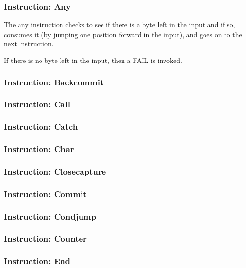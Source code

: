 \subsubsection{Instruction: Any}

The any instruction checks to see if there is a byte left in the input
and if so, consumes it (by jumping one position forward in the input),
and goes on to the next instruction.

If there is no byte left in the input, then a FAIL is invoked.

\subsubsection{Instruction: Backcommit}

\subsubsection{Instruction: Call}

\subsubsection{Instruction: Catch}

\subsubsection{Instruction: Char}

\subsubsection{Instruction: Closecapture}

\subsubsection{Instruction: Commit}

\subsubsection{Instruction: Condjump}

\subsubsection{Instruction: Counter}

\subsubsection{Instruction: End}

